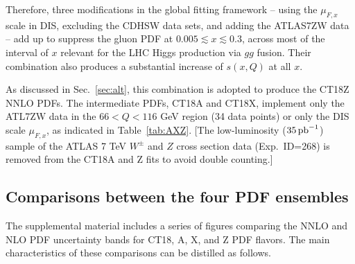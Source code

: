 Therefore, three modifications in the global fitting framework -- using
the $\mu_{F,x}$ scale in DIS, excluding the CDHSW data sets, and
adding the ATLAS7ZW data -- add up to suppress the gluon PDF at
$0.005 \lesssim x \lesssim 0.3$, across most of the interval
of $x$ relevant for the LHC
Higgs production via $gg$ fusion. Their combination also produces a
substantial increase of $s(x,Q)$ at all $x$. 

As discussed in Sec.~\ref{sec:alt}, this combination is adopted to
produce the CT18Z NNLO PDFs. The intermediate PDFs, CT18A and CT18X,
implement only the ATL7ZW data in the $66 < Q < 116$ GeV region (34
data points) or only the DIS scale $\mu_{F,x}$, as
indicated in Table~\ref{tab:AXZ}. [The low-luminosity
($35\, {\rm pb}^{-1}$) sample of the ATLAS 7 TeV  $W^\pm$ and $Z$
cross section data  (Exp.~ID=268) is removed from the CT18A and Z fits
to avoid double counting.]

\subsection{Comparisons between the four PDF ensembles}
\label{sec:CT18ZvsCT18}
%

The supplemental material includes a series of figures comparing the NNLO and NLO PDF uncertainty bands for CT18, A, X, and Z PDF flavors. The main characteristics of these comparisons can be distilled as follows.

